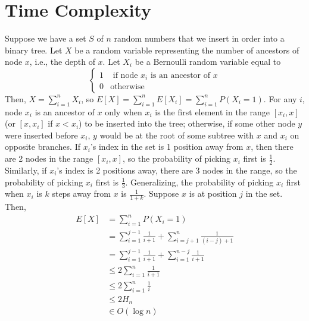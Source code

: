 \documentclass[12pt]{article}
\begin{document}
\section*{Time Complexity}
Suppose we have a set $S$ of $n$ random numbers that we insert in order into a binary tree. Let $X$ be a random variable representing the number of ancestors of node $x$, i.e., the depth of $x$. Let $X_i$ be a Bernoulli random variable equal to
\[
  \begin{cases}
      1 & \text{ if node $x_i$ is an ancestor of $x$} \\
      0 & \text{otherwise}
   \end{cases}
\]
Then, $X = \sum_{i=1}^nX_i$, so $E[X] = \sum_{i=1}^nE[X_i] = \sum_{i=1}^nP(X_i=1)$. For any $i$, node $x_i$ is an ancestor of $x$ only when $x_i$ is the first element in the range $[x_i, x]$ (or $[x, x_i]$ if $x < x_i$) to be inserted into the tree; otherwise, if some other node $y$ were inserted before $x_i$, $y$ would be at the root of some subtree with $x$ and $x_i$ on opposite branches. If $x_i$'s index in the set is 1 position away from $x$, then there are 2 nodes in the range $[x_i, x]$, so the probability of picking $x_i$ first is $\frac{1}{2}$. Similarly, if $x_i$'s index is 2 positions away, there are 3 nodes in the range, so the probability of picking $x_i$ first is $\frac{1}{3}$. Generalizing, the probability of picking $x_i$ first when $x_i$ is $k$ steps away from $x$ is $\frac{1}{1+k}$. Suppose $x$ is at position $j$ in the set. Then,
\begin{align*}
  E[X] &= \sum_{i=1}^nP(X_i=1) \\
  & = \sum_{i=1}^{j-1} \frac{1}{i+1} + \sum_{i=j+1}^n \frac{1}{(i-j)+1} \\
  &= \sum_{i=1}^{j-1} \frac{1}{i+1} + \sum_{i=1}^{n-j} \frac{1}{i+1} \\
  &\leq 2\sum_{i=1}^{n} \frac{1}{i+1} \\
  &\leq 2\sum_{i=1}^{n} \frac{1}{i} \\
  &\leq 2H_n \\
  & \in O(\log n)
\end{align*}
\end{document}
